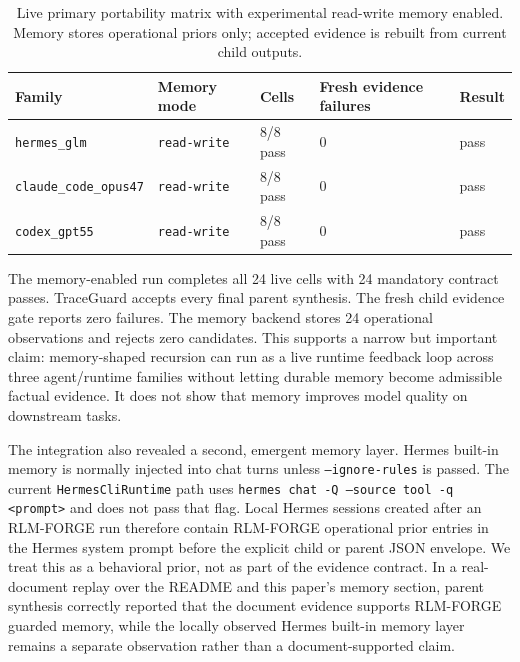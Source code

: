 \documentclass[11pt,a4paper]{article}
\begin{document}
\begin{table}[t]
\centering
\caption{Live primary portability matrix with experimental read-write memory
enabled. Memory stores operational priors only; accepted evidence is rebuilt
from current child outputs.}
\label{tab:memory-primary}
\small
\begin{tabular}{lllll}
\toprule
Family & Memory mode & Cells & Fresh evidence failures & Result \\
\midrule
\texttt{hermes\_glm} & \texttt{read-write} & 8/8 pass & 0 & pass \\
\texttt{claude\_code\_opus47} & \texttt{read-write} & 8/8 pass & 0 & pass \\
\texttt{codex\_gpt55} & \texttt{read-write} & 8/8 pass & 0 & pass \\
\bottomrule
\end{tabular}
\end{table}

The memory-enabled run completes all 24 live cells with 24 mandatory contract
passes. TraceGuard accepts every final parent synthesis. The fresh child
evidence gate reports zero failures. The memory backend stores 24 operational
observations and rejects zero candidates. This supports a narrow but important
claim: memory-shaped recursion can run as a live runtime feedback loop across
three agent/runtime families without letting durable memory become admissible
factual evidence. It does not show that memory improves model quality on
downstream tasks.

The integration also revealed a second, emergent memory layer. Hermes built-in
memory is normally injected into chat turns unless \texttt{--ignore-rules} is
passed. The current \texttt{HermesCliRuntime} path uses
\texttt{hermes chat -Q --source tool -q <prompt>} and does not pass that flag.
Local Hermes sessions created after an RLM-FORGE run therefore contain
RLM-FORGE operational prior entries in the Hermes system prompt before the
explicit child or parent JSON envelope. We treat this as a behavioral prior,
not as part of the evidence contract. In a real-document replay over the README
and this paper's memory section, parent synthesis correctly reported that the
document evidence supports RLM-FORGE guarded memory, while the locally observed
Hermes built-in memory layer remains a separate observation rather than a
document-supported claim.
\end{document}
